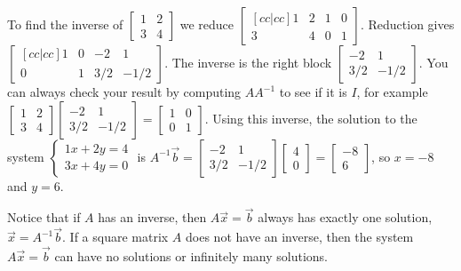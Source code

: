{\begin{example}\label{ex inverse}
To find the inverse of 
$\begin{bmatrix} 1&2\\3&4\end{bmatrix}$ 
we reduce 
$\begin{bmatrix}[cc|cc] 1&2&1&0\\3&4&0&1\end{bmatrix}$.  
Reduction gives 
$\begin{bmatrix}[cc|cc] 1&0&-2&1\\0&1&3/2&-1/2
\end{bmatrix}$. 
The inverse is the right block  
$ \begin{bmatrix} -2&1\\3/2&-1/2
\end{bmatrix}$. 
%
You can always check your result by computing $AA^{-1}$ to see if it is $I$, for example
$\begin{bmatrix} 1&2\\ 3&4\end{bmatrix} \begin{bmatrix} -2&1\\3/2&-1/2\end{bmatrix} 
=  \begin{bmatrix} 1&0\\0&1
\end{bmatrix}$. 
Using this inverse, the solution to the system 
$\begin{cases}1x+2y=4\\3x+4y=0\end{cases}$ is $A^{-1}\vec b 
= \begin{bmatrix} -2&1\\3/2&-1/2\end{bmatrix}
\begin{bmatrix}4\\0\end{bmatrix} 
=  \begin{bmatrix}-8\\6\end{bmatrix}$, so $x=-8$ and $y=6$.
\end{example}

Notice that if $A$ has an inverse, then $A\vec x=\vec b$ always has exactly one solution, $\vec x=A^{-1}\vec b$.  If a square matrix $A$ does not have an inverse, then the system $A\vec x=\vec b$ can have no solutions or infinitely many solutions.

}
